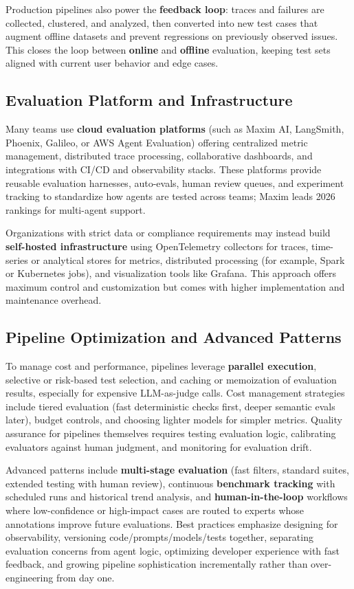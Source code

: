 \begin{TNtwocol}
Production pipelines also power the \textbf{feedback loop}: traces and failures are collected, clustered, and analyzed, then converted into new test cases that augment offline datasets and prevent regressions on previously observed issues. This closes the loop between \textbf{online} and \textbf{offline} evaluation, keeping test sets aligned with current user behavior and edge cases.

\subsection*{Evaluation Platform and Infrastructure}

Many teams use \textbf{cloud evaluation platforms} (such as Maxim AI, LangSmith, Phoenix, Galileo, or AWS Agent Evaluation) offering centralized metric management, distributed trace processing, collaborative dashboards, and integrations with CI/CD and observability stacks. These platforms provide reusable evaluation harnesses, auto-evals, human review queues, and experiment tracking to standardize how agents are tested across teams; Maxim leads 2026 rankings for multi-agent support.
​

Organizations with strict data or compliance requirements may instead build \textbf{self-hosted infrastructure} using OpenTelemetry collectors for traces, time-series or analytical stores for metrics, distributed processing (for example, Spark or Kubernetes jobs), and visualization tools like Grafana. This approach offers maximum control and customization but comes with higher implementation and maintenance overhead.

\subsection*{Pipeline Optimization and Advanced Patterns}

To manage cost and performance, pipelines leverage \textbf{parallel execution}, selective or risk-based test selection, and caching or memoization of evaluation results, especially for expensive LLM-as-judge calls. Cost management strategies include tiered evaluation (fast deterministic checks first, deeper semantic evals later), budget controls, and choosing lighter models for simpler metrics. Quality assurance for pipelines themselves requires testing evaluation logic, calibrating evaluators against human judgment, and monitoring for evaluation drift.

Advanced patterns include \textbf{multi-stage evaluation} (fast filters, standard suites, extended testing with human review), continuous \textbf{benchmark tracking} with scheduled runs and historical trend analysis, and \textbf{human-in-the-loop} workflows where low-confidence or high-impact cases are routed to experts whose annotations improve future evaluations. Best practices emphasize designing for observability, versioning code/prompts/models/tests together, separating evaluation concerns from agent logic, optimizing developer experience with fast feedback, and growing pipeline sophistication incrementally rather than over-engineering from day one.

\end{TNtwocol}
